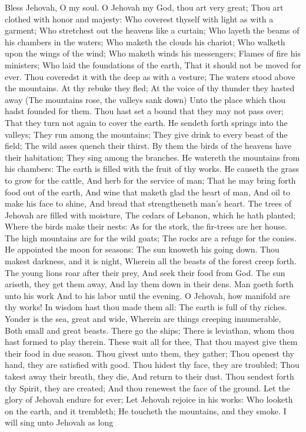 Bless Jehovah, O my soul. O Jehovah my God, thou art very great; Thou art clothed with honor and majesty:  Who coverest thyself with light as with a garment; Who stretchest out the heavens like a curtain;  Who layeth the beams of his chambers in the waters; Who maketh the clouds his chariot; Who walketh upon the wings of the wind;  Who maketh winds his messengers; Flames of fire his ministers;  Who laid the foundations of the earth, That it should not be moved for ever.  Thou coveredst it with the deep as with a vesture; The waters stood above the mountains.  At thy rebuke they fled; At the voice of thy thunder they hasted away  (The mountains rose, the valleys sank down) Unto the place which thou hadst founded for them.  Thou hast set a bound that they may not pass over; That they turn not again to cover the earth.  He sendeth forth springs into the valleys; They run among the mountains;  They give drink to every beast of the field; The wild asses quench their thirst.  By them the birds of the heavens have their habitation; They sing among the branches.  He watereth the mountains from his chambers: The earth is filled with the fruit of thy works.  He causeth the grass to grow for the cattle, And herb for the service of man; That he may bring forth food out of the earth,  And wine that maketh glad the heart of man, And oil to make his face to shine, And bread that strengtheneth man’s heart.  The trees of Jehovah are filled with moisture, The cedars of Lebanon, which he hath planted;  Where the birds make their nests: As for the stork, the fir-trees are her house.  The high mountains are for the wild goats; The rocks are a refuge for the conies.  He appointed the moon for seasons: The sun knoweth his going down.  Thou makest darkness, and it is night, Wherein all the beasts of the forest creep forth.  The young lions roar after their prey, And seek their food from God.  The sun ariseth, they get them away, And lay them down in their dens.  Man goeth forth unto his work And to his labor until the evening.  O Jehovah, how manifold are thy works! In wisdom hast thou made them all: The earth is full of thy riches.  Yonder is the sea, great and wide, Wherein are things creeping innumerable, Both small and great beasts.  There go the ships; There is leviathan, whom thou hast formed to play therein.  These wait all for thee, That thou mayest give them their food in due season.  Thou givest unto them, they gather; Thou openest thy hand, they are satisfied with good.  Thou hidest thy face, they are troubled; Thou takest away their breath, they die, And return to their dust.  Thou sendest forth thy Spirit, they are created; And thou renewest the face of the ground.  Let the glory of Jehovah endure for ever; Let Jehovah rejoice in his works:  Who looketh on the earth, and it trembleth; He toucheth the mountains, and they smoke.  I will sing unto Jehovah as long 